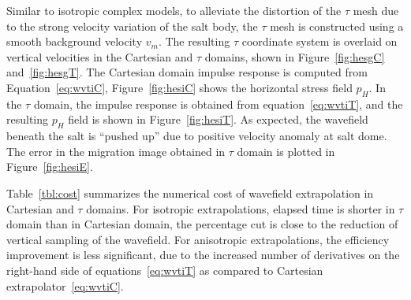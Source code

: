 Similar to isotropic complex models, to alleviate the distortion of the $\tau$ mesh due to the strong velocity variation of the  salt body, the $\tau$ mesh is constructed using a smooth background velocity $v_m$. 
The resulting $\tau$ coordinate system is overlaid on vertical velocities in the Cartesian and $\tau$ domains, shown in Figure~\ref{fig:hesgC} and~\ref{fig:hesgT}. 
The Cartesian domain impulse response is computed from Equation~\ref{eq:wvtiC}, Figure~\ref{fig:hesiC} shows the horizontal stress field $p_H$.
In the $\tau$ domain, the impulse response is obtained from equation~\ref{eq:wvtiT}, and the resulting $p_H$ field is shown in Figure~\ref{fig:hesiT}. 
As expected, the wavefield beneath the salt is ``pushed up'' due to positive velocity anomaly at salt dome. 
The error in the migration image obtained in $\tau$ domain is plotted in Figure~\ref{fig:hesiE}.


Table~\ref{tbl:cost} summarizes the numerical cost of wavefield extrapolation in Cartesian and $\tau$ domains. For isotropic extrapolations, elapsed time is shorter in $\tau$ domain than in Cartesian domain, the percentage cut is close to the reduction of vertical sampling of the wavefield. For anisotropic extrapolations, the efficiency improvement is less significant, due to the increased number of derivatives on the right-hand side of equations~\ref{eq:wvtiT} as compared to Cartesian extrapolator~\ref{eq:wvtiC}.


